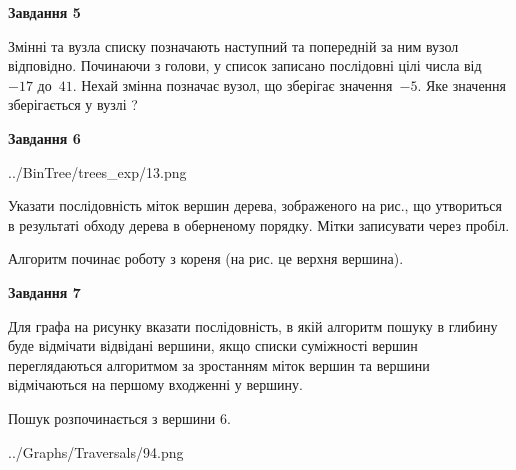 \documentclass[12pt, ukrainian]{article}
\begin{document}
{\begin {large}
{\begin {center}\textbf{Завдання 5}\end {center}}\par
Змінні  та  вузла списку позначають наступний та попередній за ним вузол відповідно. Починаючи з голови, у список записано послідовні цілі числа від~$-17$ до~$41$. Нехай змінна  позначає вузол, що зберігає значення~$-5$.
Яке значення зберігається у вузлі  ?\par
\newpage

{\begin {center}\textbf{Завдання 6}\end {center}}\par

\begin{center}
	{../BinTree/trees_exp/13.png}
\end{center}
Указати послідовність міток вершин дерева, зображеного на рис., що утвориться в результаті обходу дерева в оберненому порядку. Мітки записувати через пробіл.\par Алгоритм починає роботу з кореня (на рис. це верхня вершина).\par
\newpage

{\begin {center}\textbf{Завдання 7}\end {center}}\par
Для графа на рисунку вказати послідовність, в якій алгоритм пошуку в глибину буде відмічати відвідані вершини, якщо списки суміжності вершин переглядаються алгоритмом за зростанням міток вершин та вершини відмічаються на першому вход\-женні у вершину.\par
Пошук розпочинається з вершини 6.\par

\begin{center}
	{../Graphs/Traversals/94.png}
\end{center}\par
\newpage


\end{large}}
\end{document}
